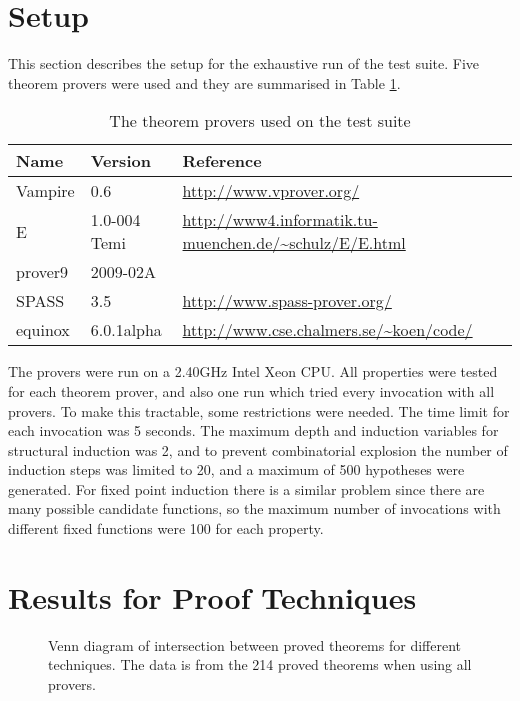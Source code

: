 \section{Setup}

This section describes the setup for the exhaustive run of the test
suite. Five theorem provers were used and they are summarised in Table
\ref{tbl:provers}.

\begin{table}[h]
  \centering
  \begin{tabular}{l | l | l}
    Name    & Version      & Reference \\
    \hline
    Vampire & 0.6          & \url{http://www.vprover.org/}                                \\
    E       & 1.0-004 Temi & \url{http://www4.informatik.tu-muenchen.de/~schulz/E/E.html} \\
    prover9 & 2009-02A     & \citep{prover9}                                              \\
    SPASS   & 3.5          & \url{http://www.spass-prover.org/}                           \\
    equinox & 6.0.1alpha   & \url{http://www.cse.chalmers.se/~koen/code/}                 \\
  \end{tabular}
  \caption{The theorem provers used on the test suite
    \label{tbl:provers}
  }
\end{table}

The provers were run on a 2.40GHz Intel Xeon CPU. All properties were
tested for each theorem prover, and also one run which tried every
invocation with all provers. To make this tractable, some restrictions
were needed. The time limit for each invocation was 5 seconds. The
maximum depth and induction variables for structural induction was 2,
and to prevent combinatorial explosion the number of induction steps
was limited to 20, and a maximum of 500 hypotheses were generated. For
fixed point induction there is a similar problem since there are many
possible candidate functions, so the maximum number of invocations
with different fixed functions were 100 for each property.

\section{Results for Proof Techniques}

\begin{figure}[h]
  \centering
  
  \caption{Venn diagram of intersection between proved theorems for
    different techniques. The data is from the 214 proved theorems
    when using all provers.
    \label{fig:venn}
  }
\end{figure}


